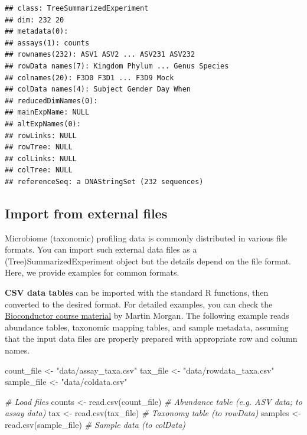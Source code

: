 \documentclass[
]{book}
\newenvironment{Shaded}{\begin{snugshade}}{\end{snugshade}}
\newcommand{\CommentTok}[1]{\textcolor[rgb]{0.56,0.35,0.01}{\textit{#1}}}
\newcommand{\FunctionTok}[1]{\textcolor[rgb]{0.00,0.00,0.00}{#1}}
\newcommand{\NormalTok}[1]{#1}
\newcommand{\OtherTok}[1]{\textcolor[rgb]{0.56,0.35,0.01}{#1}}
\newcommand{\StringTok}[1]{\textcolor[rgb]{0.31,0.60,0.02}{#1}}
\begin{document}
\begin{verbatim}
## class: TreeSummarizedExperiment 
## dim: 232 20 
## metadata(0):
## assays(1): counts
## rownames(232): ASV1 ASV2 ... ASV231 ASV232
## rowData names(7): Kingdom Phylum ... Genus Species
## colnames(20): F3D0 F3D1 ... F3D9 Mock
## colData names(4): Subject Gender Day When
## reducedDimNames(0):
## mainExpName: NULL
## altExpNames(0):
## rowLinks: NULL
## rowTree: NULL
## colLinks: NULL
## colTree: NULL
## referenceSeq: a DNAStringSet (232 sequences)
\end{verbatim}

\hypertarget{import-from-external-files}{%
\subsection{Import from external files}\label{import-from-external-files}}

Microbiome (taxonomic) profiling data is commonly distributed in
various file formats. You can import such external data files as a
(Tree)SummarizedExperiment object but the details depend on the file
format. Here, we provide examples for common formats.

\textbf{CSV data tables} can be imported with the standard R functions,
then converted to the desired format. For detailed examples, you can
check the \href{https://bioconductor.org/help/course-materials/2019/BSS2019/04_Practical_CoreApproachesInBioconductor.html}{Bioconductor course
material}
by Martin Morgan. The following example reads abundance tables,
taxonomic mapping tables, and sample metadata, assuming that the
input data files are properly prepared with appropriate row and
column names.

\begin{Shaded}
\begin{Highlighting}[]
\NormalTok{count\_file }\OtherTok{\textless{}{-}} \StringTok{"data/assay\_taxa.csv"}
\NormalTok{tax\_file }\OtherTok{\textless{}{-}} \StringTok{"data/rowdata\_taxa.csv"}
\NormalTok{sample\_file }\OtherTok{\textless{}{-}} \StringTok{"data/coldata.csv"}

\CommentTok{\# Load files}
\NormalTok{counts  }\OtherTok{\textless{}{-}} \FunctionTok{read.csv}\NormalTok{(count\_file)   }\CommentTok{\# Abundance table (e.g. ASV data; to assay data)}
\NormalTok{tax     }\OtherTok{\textless{}{-}} \FunctionTok{read.csv}\NormalTok{(tax\_file)     }\CommentTok{\# Taxonomy table (to rowData)}
\NormalTok{samples }\OtherTok{\textless{}{-}} \FunctionTok{read.csv}\NormalTok{(sample\_file)  }\CommentTok{\# Sample data (to colData)}
\end{Highlighting}
\end{Shaded}
\end{document}
